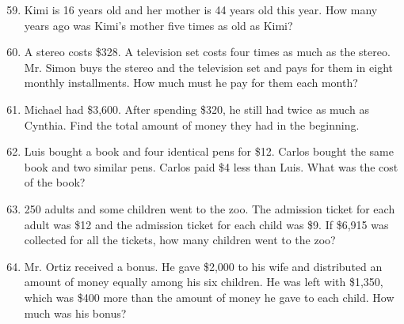 \documentclass[11pt, a4paper]{article}
\begin{document}
\begin{enumerate}[label=\arabic*.]
    \setcounter{enumi}{58}
    \item Kimi is 16 years old and her mother is 44 years old this year. How many years ago was Kimi's mother five times as old as Kimi?

    \vspace{7cm}

    \item A stereo costs \$328. A television set costs four times as much as the stereo. Mr. Simon buys the stereo and the television set and pays for them in eight monthly installments. How much must he pay for them each month?

    \vspace{7cm}

    \item Michael had \$3,600. After spending \$320, he still had twice as much as Cynthia. Find the total amount of money they had in the beginning.

\end{enumerate}

\pagebreak

\begin{enumerate}[label=\arabic*.]
    \setcounter{enumi}{61}
    \item Luis bought a book and four identical pens for \$12. Carlos bought the same book and two similar pens. Carlos paid \$4 less than Luis. What was the cost of the book?

    \vspace{7cm}

    \item 250 adults and some children went to the zoo. The admission ticket for each adult was \$12 and the admission ticket for each child was \$9. If \$6,915 was collected for all the tickets, how many children went to the zoo?

    \vspace{7cm}

    \item Mr. Ortiz received a bonus. He gave \$2,000 to his wife and distributed an amount of money equally among his six children. He was left with \$1,350, which was \$400 more than the amount of money he gave to each child. How much was his bonus?

\end{enumerate}
\end{document}
